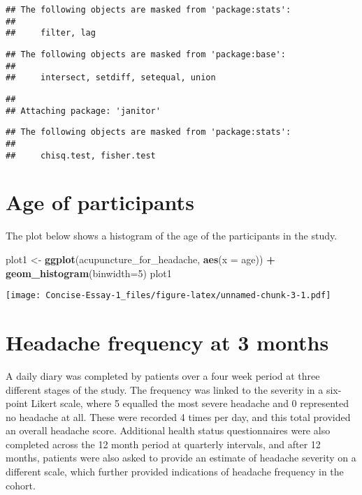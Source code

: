 \documentclass[
]{article}
\newenvironment{Shaded}{\begin{snugshade}}{\end{snugshade}}
\newcommand{\DataTypeTok}[1]{\textcolor[rgb]{0.13,0.29,0.53}{#1}}
\newcommand{\DecValTok}[1]{\textcolor[rgb]{0.00,0.00,0.81}{#1}}
\newcommand{\KeywordTok}[1]{\textcolor[rgb]{0.13,0.29,0.53}{\textbf{#1}}}
\newcommand{\NormalTok}[1]{#1}
\newcommand{\OperatorTok}[1]{\textcolor[rgb]{0.81,0.36,0.00}{\textbf{#1}}}
\newcommand{\StringTok}[1]{\textcolor[rgb]{0.31,0.60,0.02}{#1}}
\begin{document}
\begin{verbatim}
## The following objects are masked from 'package:stats':
## 
##     filter, lag
\end{verbatim}

\begin{verbatim}
## The following objects are masked from 'package:base':
## 
##     intersect, setdiff, setequal, union
\end{verbatim}

\begin{verbatim}
## 
## Attaching package: 'janitor'
\end{verbatim}

\begin{verbatim}
## The following objects are masked from 'package:stats':
## 
##     chisq.test, fisher.test
\end{verbatim}

\hypertarget{age-of-participants}{%
\section{Age of participants}\label{age-of-participants}}

The plot below shows a histogram of the age of the participants in the
study.

\begin{Shaded}
\begin{Highlighting}[]
\NormalTok{plot1 <-}\StringTok{ }\KeywordTok{ggplot}\NormalTok{(acupuncture_for_headache, }\KeywordTok{aes}\NormalTok{(}\DataTypeTok{x =}\NormalTok{ age)) }\OperatorTok{+}\StringTok{ }
\StringTok{      }\KeywordTok{geom_histogram}\NormalTok{(}\DataTypeTok{binwidth=}\DecValTok{5}\NormalTok{)}
\NormalTok{plot1}
\end{Highlighting}
\end{Shaded}

\texttt{[image: Concise-Essay-1\_files/figure-latex/unnamed-chunk-3-1.pdf]}

\hypertarget{headache-frequency-at-3-months}{%
\section{Headache frequency at 3
months}\label{headache-frequency-at-3-months}}

A daily diary was completed by patients over a four week period at three
different stages of the study. The frequency was linked to the severity
in a six-point Likert scale, where 5 equalled the most severe headache
and 0 represented no headache at all. These were recorded 4 times per
day, and this total provided an overall headache score. Additional
health status questionnaires were also completed across the 12 month
period at quarterly intervals, and after 12 months, patients were also
asked to provide an estimate of headache severity on a different scale,
which further provided indications of headache frequency in the cohort.
\end{document}
